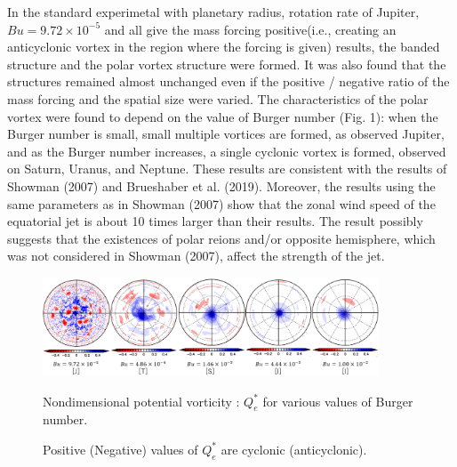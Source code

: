 \documentclass[a4j,8pt]{jarticle}
\begin{document}
In the standard experimetal with planetary radius, rotation rate of Jupiter, $Bu = 9.72\times 10^{-5}$
and all give the mass forcing positive(i.e., creating an anticyclonic vortex in the region where the forcing is given) results,
the banded structure and the polar vortex structure were formed.
%
It was also found that the structures remained almost unchanged
even if the positive / negative
ratio of the mass forcing and the spatial size were varied.
%
The characteristics of the polar vortex were
found to depend on the value of Burger number (Fig. 1):
when the Burger number is small,
small multiple vortices are formed, as observed Jupiter,
and as the Burger number increases,
a single cyclonic vortex is formed, observed on Saturn, Uranus, and Neptune.
%
These results are consistent with the results of Showman (2007) and Brueshaber et al. (2019).
%
Moreover, the results using the same parameters as in Showman (2007) show that
the zonal wind speed of the equatorial jet is
about 10 times larger than their results.
%
The result possibly suggests that the existences of polar reions and/or opposite hemisphere,
which was not considered in Showman (2007), affect the strength of the jet.
%
\begin{figure}[b]
  \begin{center}
  \includegraphics[width=10cm]{./fig/case1_nonqv_a.png}
  \caption{ \footnotesize Nondimensional potential vorticity : $Q_e^*$ for various values of Burger number.}
\captionsetup{labelformat=empty,labelsep=none}
\caption{\footnotesize Positive (Negative) values of $Q_e^*$ are cyclonic (anticyclonic).}
  \label{case1:nonqv_a}
  \end{center}
\end{figure}
%
%
\end{document}
